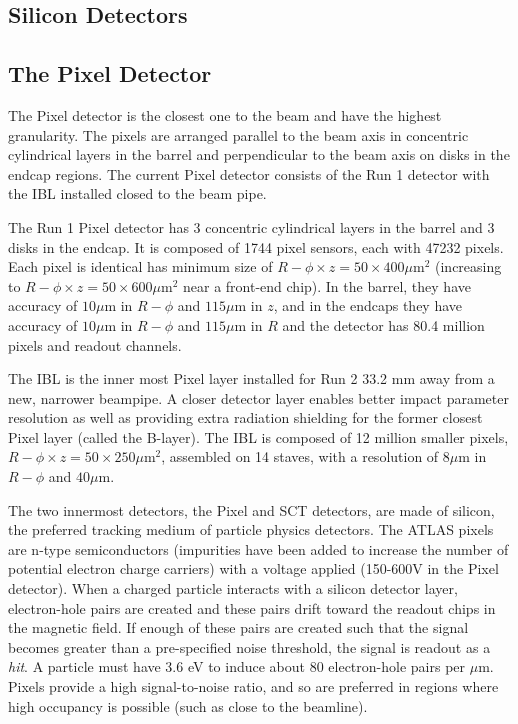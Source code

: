 \subsection{Silicon Detectors}



\subsection{The Pixel Detector}

The Pixel detector is the closest one to the beam and have the highest granularity. The pixels are arranged parallel to the beam axis in concentric cylindrical layers in the barrel and perpendicular to the beam axis on disks in the endcap regions. The current Pixel detector consists of the Run 1 detector with the \ac{IBL} installed closed to the beam pipe. 

The Run 1 Pixel detector has 3 concentric cylindrical layers in the barrel and 3 disks in the endcap. It is composed of 1744 pixel sensors, each with 47232 pixels. Each pixel is identical has minimum size of $R-\phi \times z = 50 \times 400 \mu \textrm{m}^{2}$ (increasing to $R-\phi \times z = 50 \times 600 \mu \textrm{m}^{2}$ near a front-end chip). In the barrel, they have accuracy of $10 \mu \textrm{m}$ in $R-\phi$ and $115 \mu \textrm{m}$ in $z$, and in the endcaps they have accuracy of $10 \mu \textrm{m}$ in $R-\phi$ and $115 \mu \textrm{m}$ in $R$ and the detector has 80.4 million pixels and readout channels. 

The \ac{IBL} is the inner most Pixel layer installed for Run 2 33.2 mm away from a new, narrower beampipe. A closer detector layer enables better impact parameter resolution as well as providing extra radiation shielding for the former closest Pixel layer (called the B-layer). The \ac{IBL} is composed of 12 million smaller pixels, $R-\phi \times z = 50 \times 250 \mu \textrm{m}^{2}$, assembled on 14 staves, with a resolution of $8 \mu\textrm{m}$ in $R-\phi$ and $40 \mu\textrm{m}$.

The two innermost detectors, the Pixel and \ac{SCT} detectors, are made of silicon, the preferred tracking medium of particle physics detectors. The \ac{ATLAS} pixels are n-type semiconductors (impurities have been added to increase the number of potential electron charge carriers) with a voltage applied (150-600V in the Pixel detector).  When a charged particle interacts with a silicon detector layer, electron-hole pairs are created and these pairs drift toward the readout chips in the magnetic field. If enough of these pairs are created such that the signal becomes greater than a pre-specified noise threshold, the signal is readout as a \emph{hit}. A particle must have 3.6 eV to induce about 80 electron-hole pairs per $\mu$m. Pixels provide a high signal-to-noise ratio, and so are preferred in regions where high occupancy is possible (such as close to the beamline). \cite{silicon} 


